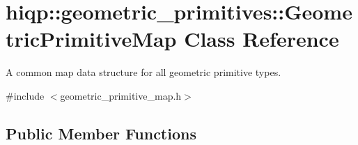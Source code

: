 \hypertarget{classhiqp_1_1geometric__primitives_1_1GeometricPrimitiveMap}{\section{hiqp\-:\-:geometric\-\_\-primitives\-:\-:Geometric\-Primitive\-Map Class Reference}
\label{classhiqp_1_1geometric__primitives_1_1GeometricPrimitiveMap}
}


A common map data structure for all geometric primitive types.  




{\ttfamily \#include $<$geometric\-\_\-primitive\-\_\-map.\-h$>$}

\subsection*{Public Member Functions}
